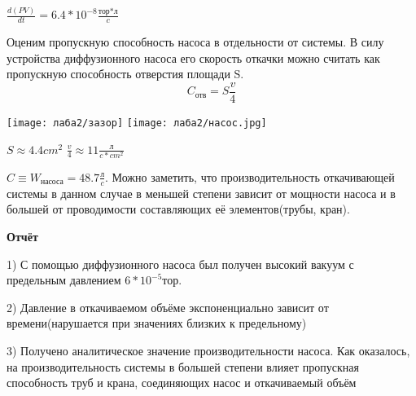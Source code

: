 \documentclass[a4paper]{article}
\begin{document}
\vspace{5pt}
$\frac{d(PV)}{dt} = 6.4 * 10^{-8} \frac{\text{тор*л}}{c}$

\vspace{5pt}
Оценим пропускную способность насоса в отдельности от системы. В силу устройства диффузионного насоса
его скорость откачки можно считать как пропускную способность отверстия площади S.
\[C_{\text{отв}} = S\frac{v}{4}\]

\texttt{[image: лаба2/зазор]}
\texttt{[image: лаба2/насос.jpg]}

$S \approx 4.4 cm^2$ \hspace{3pt}$\frac{v}{4} \approx 11 \frac{\text{л}}{c*cm^2}$
\vspace{5pt}

$C \equiv W_{\text{насоса}} = 48.7 \frac{\text{л}}{c}$. Можно заметить, что производительность откачивающей системы в данном случае в меньшей степени
зависит от мощности насоса и в большей от проводимости составляющих её элементов(трубы, кран).
\vspace{10pt}

\textbf{Отчёт}

\vspace{5pt}

1) С помощью диффузионного насоса был получен высокий вакуум с предельным давлением $6 * 10^{-5}$тор.
\vspace{5pt}

2) Давление в откачиваемом объёме экспоненциально зависит от времени(нарушается при значениях близких к предельному)
\vspace{5pt}

3) Получено аналитическое значение производительности насоса. Как оказалось, на производительность системы
 в большей степени влияет пропускная способность труб и крана, соединяющих насос и откачиваемый объём
\end{document}
